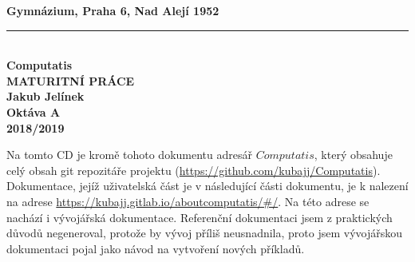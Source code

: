 \begin{titlepage}
    \begin{center}
        \textbf{\large Gymnázium, Praha 6, Nad Alejí 1952}\\
        \vspace{0.2cm}
        \rule{\textwidth}{0.5pt}\\
        \vspace{5cm}
        \textbf{\Huge Computatis}\\
        \vspace{5cm}
        \textbf{\large MATURITNÍ PRÁCE}\\
        \vspace{2cm}
        \textbf{\large Jakub Jelínek}\\
        \textbf{Oktáva A}\\
        \vspace*{\fill}
        \textbf{\large 2018/2019}\\
    \end{center}
\end{titlepage}
\newpage
Na tomto CD je kromě tohoto dokumentu adresář $Computatis$, který obsahuje celý obsah git repozitáře projektu (\url{https://github.com/kubajj/Computatis}). Dokumentace, jejíž uživatelská část je v následující části dokumentu, je k nalezení na adrese \url{https://kubajj.gitlab.io/aboutcomputatis/#/}. Na této adrese se nachází i vývojářská dokumentace. Referenční dokumentaci jsem z praktických důvodů negeneroval, protože by vývoj příliš neusnadnila, proto jsem vývojářskou dokumentaci pojal jako návod na vytvoření nových příkladů.
\newpage
